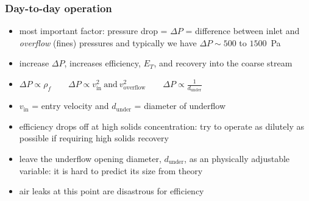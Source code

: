 \begin{frame}\frametitle{Day-to-day operation}
	\begin{itemize}
		\item	most important factor: pressure drop = $\Delta P$ = difference between inlet and \emph{overflow} (fines) pressures and typically we have $\Delta P \sim 500$ to $1500$~Pa
		\item	increase $\Delta P$, increases efficiency, $E_T$,  and recovery into the coarse stream %
		\item	$\Delta P \propto \rho_f \qquad  \Delta P \propto v_\text{in}^2~\text{and}~v_\text{overflow}^2 \qquad  \Delta P \propto \displaystyle\frac{1}{d_\text{under}}$
		\item	$v_\text{in}$ = entry velocity and $d_\text{under}$ = diameter of underflow
		\item	efficiency drops off at high solids concentration: try to operate as dilutely as possible if requiring high solids recovery
		\item	leave the underflow opening diameter, $d_\text{under}$, as an physically adjustable variable: it is hard to predict its size from theory
		\item	air leaks at this point are disastrous for efficiency 
	\end{itemize}
\end{frame}

